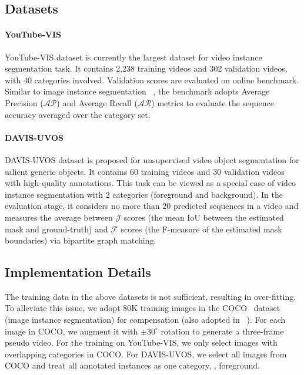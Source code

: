 \documentclass[10pt,twocolumn,letterpaper]{article}
\begin{document}
	\subsection{Datasets} \label{Sec:dataset}
	\paragraph{YouTube-VIS~\cite{yang2019vis}} YouTube-VIS dataset is currently the largest dataset for video instance segmentation task. It contains 2,238 training videos and 302 validation videos, with 40 categories involved. Validation scores are evaluated on online benchmark. Similar to image instance segmentation~\cite{lin2014coco} , the benchmark adopts Average Precision ($\mathcal{AP}$) and Average Recall ($\mathcal{AR}$) metrics to evaluate the sequence accuracy averaged over the category set. 
	
	\vspace{-0.2in}
	\paragraph{DAVIS-UVOS~\cite{Caelles_arXiv_2019}} DAVIS-UVOS dataset is proposed for unsupervised video object segmentation for salient generic objects. It contains 60 training videos and 30 validation videos with high-quality annotations.
	This task can be viewed as a special case of video instance segmentation with 2 categories (foreground and background). 
	In the evaluation stage, it considers no more than $20$ predicted sequences in a video and measures the average between $\mathcal{J}$ scores (the mean IoU between the estimated mask and ground-truth) and $\mathcal{F}$ scores (the F-measure of the estimated mask boundaries) via bipartite graph matching.	
	
	\subsection{Implementation Details}\label{Sec:Imp}
	The training data in the above datasets is not sufficient, resulting in over-fitting. To alleviate this issue, we adopt 80K training images in the COCO~\cite{lin2014coco} dataset (image instance segmentation) for compensation (also adopted in ~\cite{athar2020stem}).
	For each image in COCO, we augment it with $\pm30^{\circ}$ rotation to generate a three-frame pseudo video. For the training on YouTube-VIS, we only select images with overlapping categories in COCO. For DAVIS-UVOS, we select all images from COCO and treat all annotated instances as one category, \ie, foreground. 
	
\end{document}
